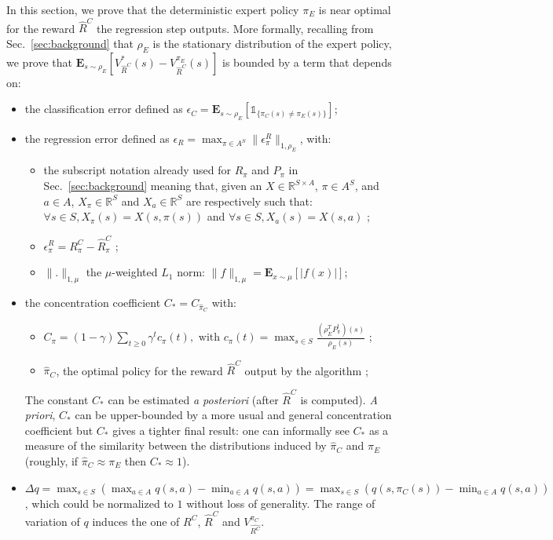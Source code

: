 \documentclass{llncs}
\newcommand{\E}{\mathbf{E}}
\begin{document}
In this section, we prove that the deterministic expert policy $\pi_E$ is near optimal for the reward $\hat{R}^C$ the regression step outputs.
More formally, recalling from Sec.~\ref{sec:background} that $\rho_E$ is the stationary distribution of the expert policy, we prove that $\E_{s\sim\rho_E}[V^*_{\hat{R}^C}(s)-V^{\pi_E}_{\hat{R}^C}(s)]$ is bounded by a term that depends on:
\begin{itemize}
  \item the classification error defined as
$\epsilon_C=\E_{s\sim\rho_E}[\mathds{1}_{\{\pi_C(s)\neq\pi_E(s)\}}]$;
\item the regression error defined as 
 $   \epsilon_R=\max_{\pi\in A^S}\|\epsilon_\pi^R\|_{1,\rho_E}$,
  with:
  \begin{itemize}
  \item the subscript notation already used for $R_\pi$ and $P_\pi$ in Sec.~\ref{sec:background} meaning that, given an $X\in\mathbb{R}^{S\times A}$, $\pi\in A^S$, and $a\in A$,  $X_\pi\in\mathbb{R}^S$ and $X_a\in\mathbb{R}^S$ are respectively such that: $\forall s\in S, X_\pi(s)=X(s,\pi(s))$ and $\forall s\in S, X_a(s)=X(s,a)$ ;
  \item $\epsilon^R_\pi=R^C_\pi-\hat{R}^C_\pi$ ;
  \item $\|.\|_{1,\mu}$ the $\mu$-weighted $L_1$ norm: $\|f\|_{1,\mu} = \E_{x\sim \mu}[|f(x)|]$;
  \end{itemize}
\item the concentration coefficient $C_* = C_{\hat \pi_C}$ with:
  \begin{itemize}
  \item $C_{\pi}=(1-\gamma)\sum_{t\geq0}\gamma^tc_{\pi}(t), \text{ with } c_{\pi}(t)=\max_{s\in S}\frac{(\rho_E^TP^t_\pi)(s)}{\rho_E(s)}$ ;
  \item $\hat \pi_C$, the optimal policy for the reward $\hat R^C$ output by the algorithm ;
  \end{itemize}
  The constant $C_*$ can be estimated \emph{a posteriori} (after $\hat{R}^C$ is computed). {\it A priori}, $C_*$ can be upper-bounded by a more usual and general concentration coefficient but $C_*$ gives a tighter final result: one can informally see $C_*$ as a measure of the similarity between the distributions induced by $\hat\pi_C$ and $\pi_E$ (roughly, if $\hat{\pi}_C\approx\pi_E$ then $C_* \approx 1$).
\item $\Delta q = \max_{s\in S}(\max_{a\in A}q(s,a)-\min_{a\in A}q(s,a))=\max_{s\in S}(q(s,\pi_C(s))-\min_{a\in A}q(s,a))$,
    which could be normalized to $1$ without loss of generality. The range of variation of $q$ induces the one of $R^C$, $\hat{R}^C$ and $V^{\pi_C}_{\hat{R^C}}$.
  \end{itemize}
\end{document}
